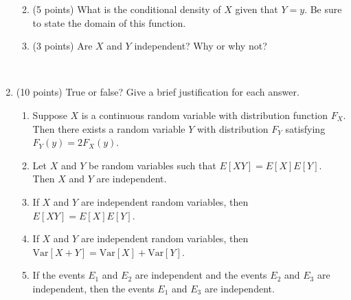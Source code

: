 \documentclass[11pt]{article}
\theoremstyle{plain}
\newcommand{\Var}{\ensuremath{\textrm{Var}}}
\begin{document}
\begin{enumerate}
\begin{enumerate}
        \vfill

        \item (5 points)
        What is the conditional density of $X$ given that $Y = y$.
        Be sure to state the domain of this function.

        \vfill

        \item (3 points)
        Are $X$ and $Y$ independent? Why or why not?
        \vfill
    \end{enumerate}

    \newpage
    \ 
    \newpage

    \item (10 points)
    True or false?
    Give a brief justification for each answer.

    \begin{enumerate}
        \item Suppose $X$ is a continuous random variable with distribution function $F_X$. 
        Then there exists a random variable $Y$ with distribution $F_Y$ satisfying $F_Y(y) = 2F_X(y)$.

        \vfill

        \item Let $X$ and $Y$ be random variables such that $E[XY] = E[X]E[Y]$.
        Then $X$ and $Y$ are independent.

        \vfill

        \item If $X$ and $Y$ are independent random variables, then $E[XY] = E[X]E[Y]$.

        \vfill

        \item If $X$ and $Y$ are independent random variables, then $\Var[X+Y] = \Var[X] + \Var[Y]$.
        \vfill

        \item If the events $E_1$ and $E_2$ are independent and the events $E_2$ and $E_3$ are independent, then the events $E_1$ and $E_3$ are independent.

        \vfill
    \end{enumerate}

    \newpage
    \ 
    \newpage
    \ 

\end{enumerate}
\end{document}
